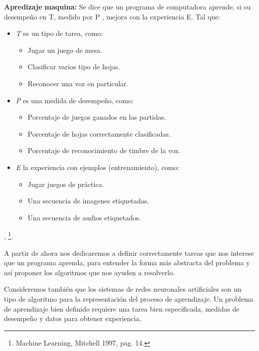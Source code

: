 \begin{definition}
 \textbf{Apredizaje maquina:} Se dice que un programa de computadora aprende, si su desempeño en T, medido por P , mejora con la experiencia E. Tal que: 

 \begin{itemize}
  \item \emph{T} es un tipo de tarea, como:
   \begin{itemize}
    \item Jugar un juego de mesa.
    \item Clasificar varios tipo de hojas.
    \item Reconocer una voz en particular.
   \end{itemize}
  \item \emph{P} es una medida de desempeño, como:
    \begin{itemize}
     \item Porcentaje de juegos ganados en las partidas.
     \item Porcentaje de hojas correctamente clasificadas.
     \item Porcentaje de reconocimiento de timbre de la voz.
    \end{itemize}
  \item \emph{E} la experiencia con ejemplos (entrenamiento), como:
    \begin{itemize}
        \item Jugar juegos de práctica.
        \item Una secuencia de imagenes etiquetadas.
        \item Una secuencia de audios etiquetados.
    \end{itemize}
    

 \end{itemize}

 , \footnote{Machine Learning, Mitchell 1997, pag. 14.}.
\end{definition}

A partir de ahora nos dedicaremos a definir correctamente tareas que nos interese que un programa aprenda, para entender la forma más abstracta del problema y así proponer los algoritmos que nos ayuden a resolverlo.

Consideremos también que los sistemas de redes neuronales artificiales son un tipo de algoritmo para la representación del proceso de aprendizaje. Un problema de aprendizaje bien definido requiere una tarea bien especificada, medidas de desempeño y datos para obtener experiencia. 

